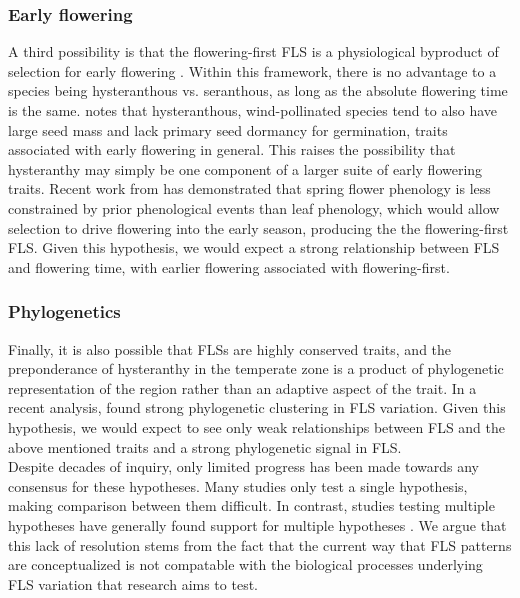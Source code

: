 \documentclass{article}
\begin{document}
\subsubsection*{Early flowering}
\indent\indent A third possibility is that the flowering-first FLS is a physiological byproduct of selection for early flowering \citep{Primack1987}. Within this framework, there is no advantage to a species being hysteranthous vs. seranthous, as long as the absolute flowering time is the same. %
\citet{Primack1987} notes that hysteranthous, wind-pollinated species tend to also have large seed mass and lack primary seed dormancy for germination, traits associated with early flowering in general. This raises the possibility that hysteranthy may simply be one component of a larger suite of early flowering traits. Recent work from \citet{Savage2019} has demonstrated that spring flower phenology is less constrained by prior phenological events than leaf phenology, which would allow selection to drive flowering into the early season, producing the the flowering-first FLS. Given this hypothesis, we would expect a strong relationship between FLS and flowering time, with earlier flowering associated with flowering-first.
\subsubsection*{Phylogenetics} 
\indent\indent Finally, it is also possible that FLSs are highly conserved traits, and the preponderance of hysteranthy in the temperate zone is a product of phylogenetic representation of the region rather than an adaptive aspect of the trait. In a recent analysis, \citet{Gougherty2018} found strong phylogenetic clustering in FLS variation. Given this hypothesis, we would expect to see only weak relationships between FLS and the above mentioned traits and a strong phylogenetic signal in FLS.\\

Despite decades of inquiry, only limited progress has been made towards any consensus for these hypotheses. Many studies only test a single hypothesis, making comparison between them difficult. In contrast, studies testing multiple hypotheses have generally found support for multiple hypotheses \citep[see][]{Bolmgren2003,Gougherty2018}. We argue that this lack of resolution stems from the fact that the current way that FLS patterns are conceptualized is not compatable with the biological processes underlying FLS variation that research aims to test.
\end{document}
